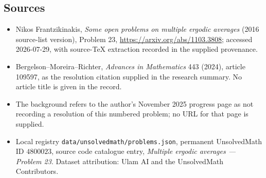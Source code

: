 \documentclass[11pt]{article}
\begin{document}
\subsection{Sources}
\begin{itemize}
\item Nikos Frantzikinakis, \emph{Some open problems on multiple ergodic averages} (2016 source-list version), Problem 23, \url{https://arxiv.org/abs/1103.3808}; accessed 2026-07-29, with source-TeX extraction recorded in the supplied provenance.
\item Bergelson--Moreira--Richter, \emph{Advances in Mathematics} 443 (2024), article 109597, as the resolution citation supplied in the research summary. No article title is given in the record.
\item The background refers to the author's November 2025 progress page as not recording a resolution of this numbered problem; no URL for that page is supplied.
\item Local registry \texttt{data/unsolvedmath/problems.json}, permanent UnsolvedMath ID $4800023$, source code catalogue entry, \emph{Multiple ergodic averages --- Problem 23}. Dataset attribution: Ulam AI and the UnsolvedMath Contributors.
\end{itemize}
\end{document}
